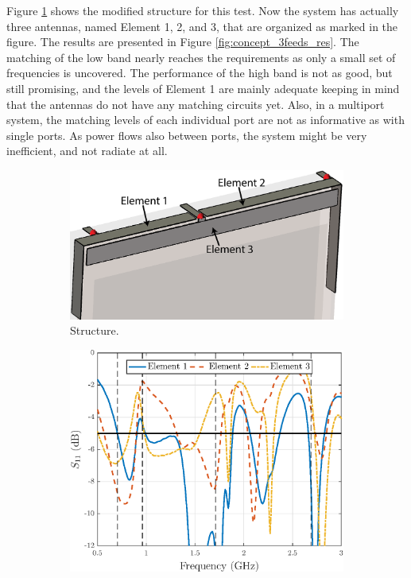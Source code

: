 Figure \ref{fig:concept_3feeds_struct} shows the modified structure for this test. Now the system has actually three antennas, named Element 1, 2, and 3, that are organized as marked in the figure. The results are presented in Figure \ref{fig:concept_3feeds_res}. The matching of the low band nearly reaches the requirements as only a small set of frequencies is uncovered. The performance of the high band is not as good, but still promising, and the levels of Element 1 are mainly adequate keeping in mind that the antennas do not have any matching circuits yet. Also, in a multiport system, the matching levels of each individual port are not as informative as with single ports. As power flows also between ports, the system might be very inefficient, and not radiate at all.
\begin{figure}[H]
    \centering
    \vspace{-8pt}
    \begin{subfigure}[b]{0.47\textwidth}
        \includegraphics[width=\textwidth]{img/concept_3feed_struct.eps}
        \caption{Structure.}
        \label{fig:concept_3feeds_struct}
    \end{subfigure}
    \begin{subfigure}[b]{0.47\textwidth}
        \includegraphics[width=\textwidth]{img/concept_3feeds.eps}

\end{subfigure}
\end{figure}
